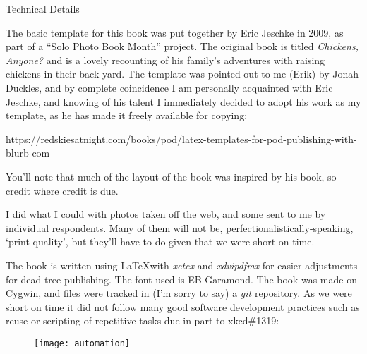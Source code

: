 \newpage

{\LARGE Technical Details}

The basic template for this book was put together by Eric Jeschke in
2009, as part of a ``Solo Photo Book Month'' project.  The original book
is titled \textit{Chickens, Anyone?} and is a lovely recounting of his
family's adventures with raising chickens in their back yard.  The template
was pointed out to me (Erik) by Jonah Duckles, and by complete coincidence
I am personally acquainted with Eric Jeschke, and knowing of his talent I
immediately decided to adopt his work as my template, as he has made it
freely available for copying:

https://redskiesatnight.com/books/pod/latex-templates-for-pod-publishing-with-blurb-com

You'll note that much of the layout of the book was inspired by his book,
so credit where credit is due.

I did what I could with photos taken off the web, and some sent to me by
individual respondents.  Many of them will not be,
perfectionalistically-speaking, `print-quality', but they'll have to do given
that we were short on time.

The book is written using \LaTeX with {\em xetex} and {\em xdvipdfmx} for
easier adjustments for dead tree publishing.  The font used is EB Garamond.
The book was made on Cygwin, and files were tracked in (I'm sorry to say) a
{\em git} repository.  As we were short on time it did not follow many good
software development practices such as reuse or scripting of repetitive tasks
due in part to xkcd\#1319:
\begin{figure}[h!]
\centering
\texttt{[image: automation]}
\end{figure}


